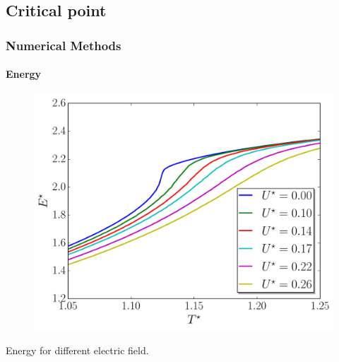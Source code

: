 \documentclass{beamer}
\begin{document}
\subsection{Critical point}
\begin{frame}
	\frametitle{Numerical Methods}
	\framesubtitle{Energy}

\begin{figure}
\includegraphics[scale=0.48]{figures/electricField_calo.pdf}
\end{figure}
\vspace{-0.6cm}
\center Energy for different electric field.
\end{frame}
\end{document}
